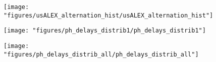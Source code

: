 

\author{Antonino Ingargiola}
\title{}


\verbatimfont{\small}

\maketitle

\begin{abstract}

\end{abstract}

\tableofcontents








\begin{figure}
\begin{center}
\texttt{[image: "figures/usALEX\_alternation\_hist/usALEX\_alternation\_hist"]}
\caption[]{}
\end{center}
\end{figure}





\begin{figure}
\begin{center}
\texttt{[image: "figures/ph\_delays\_distrib1/ph\_delays\_distrib1"]}
\caption[]{}
\end{center}
\end{figure}

\begin{figure}
\begin{center}
\texttt{[image: "figures/ph\_delays\_distrib\_all/ph\_delays\_distrib\_all"]}
\caption[]{}
\end{center}
\end{figure}

